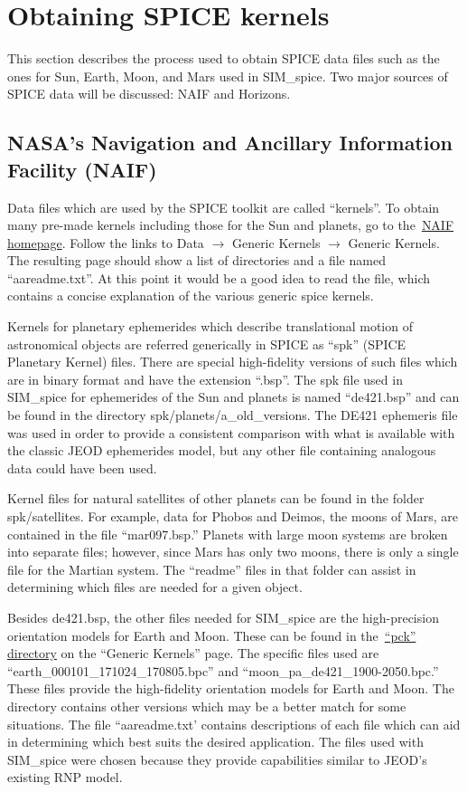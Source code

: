 \section{Obtaining SPICE kernels}
This section describes the process used to obtain SPICE data files such as
the ones for Sun, Earth, Moon, and Mars used in SIM\_spice.  Two major sources
of SPICE data will be discussed: NAIF and Horizons.


\subsection {NASA's Navigation and Ancillary Information Facility (NAIF)}
\label{subsec:naif}
Data files which are used by the SPICE toolkit are called ``kernels''.  To
obtain many pre-made kernels including those for the Sun and planets, go to
the~\href{http://naif.jpl.nasa.gov/naif}{NAIF homepage}. Follow the links to
Data $\to$ Generic Kernels $\to$ Generic Kernels.  The resulting page should
show a list of directories and a file named ``aareadme.txt''.  At this point
it would be a good idea to read the file, which contains a concise explanation
of the various generic spice kernels.

Kernels for planetary ephemerides which describe translational motion of
astronomical objects are referred generically in SPICE as ``spk''
(SPICE Planetary Kernel) files. There are special high-fidelity versions of
such files which are in binary format and have the extension ``.bsp''.
The spk file used in SIM\_spice for ephemerides of the Sun and planets is
named ``de421.bsp'' and can be found in the directory
spk/planets/a\_old\_versions. The DE421 ephemeris file was used in order to
provide a consistent comparison with what is available with the classic JEOD
ephemerides model, but any other file containing analogous data could have
been used.

Kernel files for natural satellites of other planets can be found in the
folder spk/satellites. For example, data for Phobos and Deimos, the moons of
Mars, are contained in the file ``mar097.bsp.''  Planets with large moon
systems are broken into separate files; however, since Mars has only two
moons, there is only a single file for the Martian system. The ``readme''
files in that folder can assist in determining which files are needed for
a given object.

Besides de421.bsp, the other files needed for SIM\_spice are the
high-precision orientation models for Earth and Moon.  These can be found in
the~\href{http://naif.jpl.nasa.gov/pub/naif/generic_kernels/pck}
{``pck'' directory} on the ``Generic Kernels'' page.  The specific files
used are ``earth\_000101\_171024\_170805.bpc'' and
``moon\_pa\_de421\_1900-2050.bpc.'' These files provide the high-fidelity
orientation models for Earth and Moon. The directory contains other versions
which may be a better match for some situations.  The file ``aareadme.txt'
contains descriptions of each file which can aid in determining which best
suits the desired application. The files used with SIM\_spice were chosen
because they provide capabilities similar to JEOD's existing RNP model.

